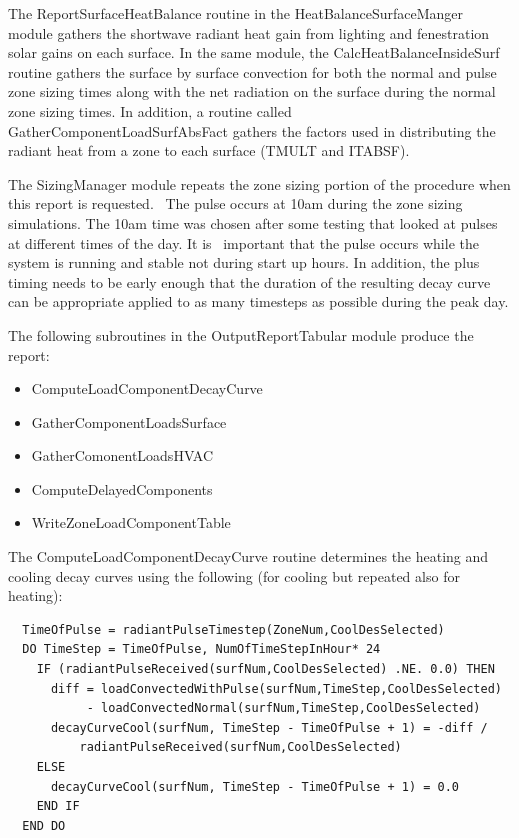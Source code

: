 The ReportSurfaceHeatBalance routine in the HeatBalanceSurfaceManger module gathers the shortwave radiant heat gain from lighting and fenestration solar gains on each surface. In the same module, the CalcHeatBalanceInsideSurf routine gathers the surface by surface convection for both the normal and pulse zone sizing times along with the net radiation on the surface during the normal zone sizing times. In addition, a routine called GatherComponentLoadSurfAbsFact gathers the factors used in distributing the radiant heat from a zone to each surface (TMULT and ITABSF).

The SizingManager module repeats the zone sizing portion of the procedure when this report is requested.~ The pulse occurs at 10am during the zone sizing simulations. The 10am time was chosen after some testing that looked at pulses at different times of the day. It is ~important that the pulse occurs while the system is running and stable not during start up hours. In addition, the plus timing needs to be early enough that the duration of the resulting decay curve can be appropriate applied to as many timesteps as possible during the peak day.

The following subroutines in the OutputReportTabular module produce the report:

\begin{itemize}
\item
  ComputeLoadComponentDecayCurve
\item
  GatherComponentLoadsSurface
\item
  GatherComonentLoadsHVAC
\item
  ComputeDelayedComponents
\item
  WriteZoneLoadComponentTable
\end{itemize}

The ComputeLoadComponentDecayCurve routine determines the heating and cooling decay curves using the following (for cooling but repeated also for heating):

\begin{lstlisting}
  TimeOfPulse = radiantPulseTimestep(ZoneNum,CoolDesSelected)
  DO TimeStep = TimeOfPulse, NumOfTimeStepInHour* 24
    IF (radiantPulseReceived(surfNum,CoolDesSelected) .NE. 0.0) THEN
      diff = loadConvectedWithPulse(surfNum,TimeStep,CoolDesSelected)
           - loadConvectedNormal(surfNum,TimeStep,CoolDesSelected)
      decayCurveCool(surfNum, TimeStep - TimeOfPulse + 1) = -diff /
          radiantPulseReceived(surfNum,CoolDesSelected)
    ELSE
      decayCurveCool(surfNum, TimeStep - TimeOfPulse + 1) = 0.0
    END IF
  END DO
\end{lstlisting}

